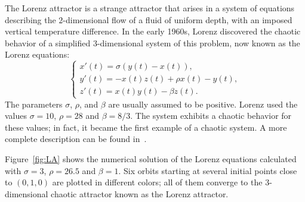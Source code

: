\documentclass{article}
\begin{document}
The Lorenz attractor is a strange attractor that arises in a system of
equations describing the $2$-dimensional flow of a fluid of uniform depth,
with an imposed vertical temperature difference.
In the early 1960s, Lorenz \cite{Lo} discovered the chaotic behavior of a
simplified $3$-dimensional system of this problem,
now known as the Lorenz equations:
\[
\left\{
\begin{array}{l}
  x'(t) = \sigma (y(t)-x(t)), \\
  y'(t) = -x(t) z(t) + \rho x(t) - y(t), \\
  z'(t) = x(t) y(t) - \beta z(t).
\end{array}
\right.
\]
The parameters $\sigma$, $\rho$, and $\beta$ are usually assumed to be positive. Lorenz used the values $\sigma=10$, $\rho=28$ and $\beta=8/3$. The system exhibits a chaotic behavior for these values; in fact, it became the first example of a chaotic system.
A more complete description can be found in~\cite{Wiki-LS}.

Figure~\ref{fig:LA} shows the numerical solution of the Lorenz equations calculated with
$\sigma = 3$, $\rho = 26.5$ and $\beta = 1$.
Six orbits starting at several initial points close to $(0,1,0)$ are plotted in different colors; all of them converge to the $3$-dimensional chaotic attractor known as the Lorenz attractor.
\end{document}
